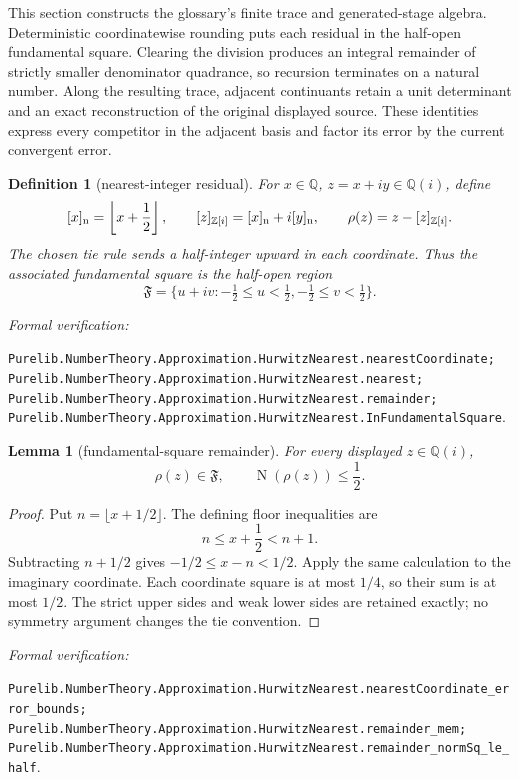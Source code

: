 \documentclass[11pt]{article}
\newtheorem{lemma}[lemma]{Lemma}
\newtheorem{definition}[definition]{Definition}
\newcommand{\Qi}{\mathbb{Q}(i)}
\newcommand{\Zi}{\mathbb{Z}[i]}
\newcommand{\Q}{\mathbb{Q}}
\newcommand{\Norm}[1]{\operatorname{N}\!\left(#1\right)}
\newcommand{\leanref}[1]{\par\smallskip\noindent
  \emph{Formal verification:}\par\nobreak
  {\raggedright\nolinkurl{#1}.\par}}
\begin{document}
This section constructs the glossary's finite trace and generated-stage
algebra.  Deterministic coordinatewise rounding puts each residual in the
half-open fundamental square.  Clearing the division produces an integral
remainder of strictly smaller denominator quadrance, so recursion terminates
on a natural number.  Along the resulting trace, adjacent continuants retain
a unit determinant and an exact reconstruction of the original displayed
source.  These identities express every competitor in the adjacent basis and
factor its error by the current convergent error.

\begin{definition}[nearest-integer residual]
\label{def:nearest-residual}
For $x\in\Q$, $z=x+iy\in\Qi$, define
\[
 [x]_{\rm n}=\left\lfloor x+\frac12\right\rfloor,
 \qquad [z]_{\Zi}=[x]_{\rm n}+i[y]_{\rm n},
 \qquad \rho(z)=z-[z]_{\Zi}.
\]
The chosen tie rule sends a half-integer upward in each coordinate.  Thus the
associated fundamental square is the half-open region
\[
 \mathfrak F=\{u+iv:-\tfrac12\le u<\tfrac12,
                         -\tfrac12\le v<\tfrac12\}.
\]
\end{definition}

\leanref{Purelib.NumberTheory.Approximation.HurwitzNearest.nearestCoordinate;
Purelib.NumberTheory.Approximation.HurwitzNearest.nearest;
Purelib.NumberTheory.Approximation.HurwitzNearest.remainder;
Purelib.NumberTheory.Approximation.HurwitzNearest.InFundamentalSquare}

\begin{lemma}[fundamental-square remainder]
\label{lem:fundamental-square-remainder}
For every displayed $z\in\Qi$,
\[
              \rho(z)\in\mathfrak F,
              \qquad \Norm{\rho(z)}\le\frac12.
\]
\end{lemma}

\begin{proof}
Put $n=\lfloor x+1/2\rfloor$.  The defining floor inequalities are
\[
                     n\le x+\frac12<n+1.
\]
Subtracting $n+1/2$ gives
$-1/2\le x-n<1/2$.  Apply the same calculation to the imaginary coordinate.
Each coordinate square is at most $1/4$, so their sum is at most $1/2$.
The strict upper sides and weak lower sides are retained exactly; no symmetry
argument changes the tie convention.
\end{proof}

\leanref{Purelib.NumberTheory.Approximation.HurwitzNearest.nearestCoordinate_error_bounds;
Purelib.NumberTheory.Approximation.HurwitzNearest.remainder_mem;
Purelib.NumberTheory.Approximation.HurwitzNearest.remainder_normSq_le_half}
\end{document}
